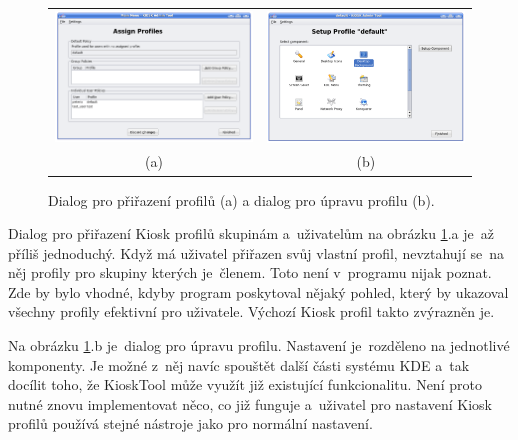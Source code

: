 \begin{figure}[ht]
\centering
\begin{tabular}{c c}
\includegraphics[width=7.2cm ,keepaspectratio]{obrazky/KioskToolKDE3/prirazeni_profilu.png}&
\includegraphics[width=7.2cm]{obrazky/KioskToolKDE3/seznam_komponent.png}\\
(a)&(b)\\
\end{tabular}
\caption{Dialog pro přiřazení profilů (a) a dialog pro úpravu profilu (b).}
\label{fig_7}
\end{figure}

Dialog pro přiřazení Kiosk profilů skupinám a~uživatelům na obrázku \ref{fig_7}.a je~až příliš jednoduchý. Když má uživatel přiřazen svůj vlastní profil, nevztahují se~na něj profily pro skupiny kterých je~členem. Toto není v~programu nijak poznat. Zde by bylo vhodné, kdyby program poskytoval nějaký pohled, který by ukazoval všechny profily efektivní pro uživatele. Výchozí Kiosk profil takto zvýrazněn je.

Na obrázku \ref{fig_7}.b je~dialog pro úpravu profilu. Nastavení je~rozděleno na jednotlivé komponenty. Je možné z~něj navíc spouštět další části systému KDE a~tak docílit toho, že KioskTool může využít již existující funkcionalitu. Není proto nutné znovu implementovat něco, co již funguje a~uživatel pro nastavení Kiosk profilů používá stejné nástroje jako pro normální nastavení.

